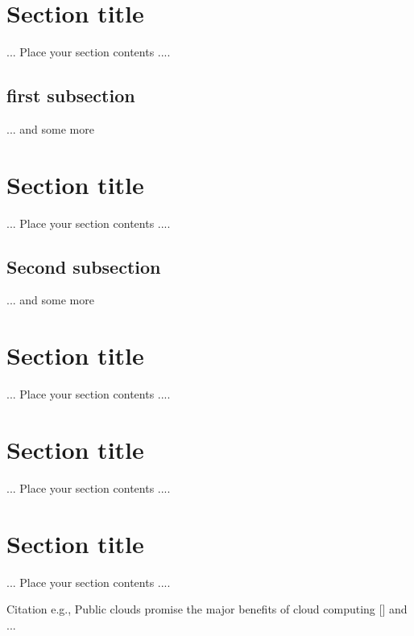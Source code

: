 {}
\ifpdf
    \graphicspath{{Chapter4/Chapter4Figs/PNG/}{Chapter4/Chapter4Figs/PDF/}{Chapter4/Chapter4Figs/}}
\else
    \graphicspath{{Chapter4/Chapter3Figs/EPS/}{Chapter4/Chapter3Figs/}}
\fi
\doublespacing
\section{Section title}
\label{sec:5.1}
... Place your section contents ....
\subsection{first subsection}
... and some more 

\section{Section title}
\label{sec:5.2}
... Place your section contents ....
\subsection{Second subsection }
... and some more 

\section{Section title}
\label{sec:5.3}
... Place your section contents ....

\section{Section title}
\label{sec:5.4}
... Place your section contents ....

\section{Section title}
\label{sec:5.5}
... Place your section contents ....

Citation e.g., Public clouds promise the major benefits of cloud computing [] and ...






